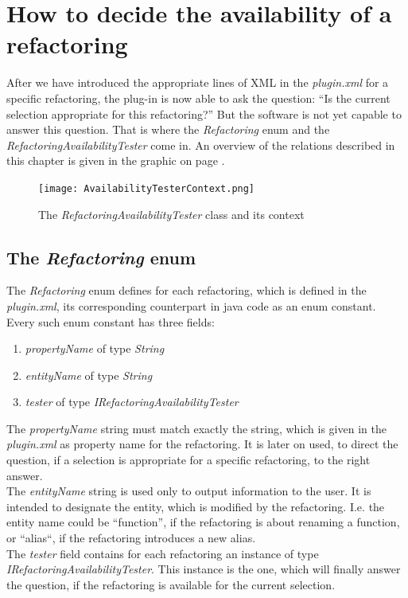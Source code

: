 \documentclass[a4paper,10pt]{report}
\begin{document}
\section{How to decide the availability of a refactoring}
After we have introduced the appropriate lines of XML in the {\it plugin.xml} for a specific refactoring, the plug-in is now able to ask the question:
``Is the current selection appropriate for this refactoring?''
But the software is not yet capable to answer this question.
That is where the {\it Refactoring} enum and the {\it RefactoringAvailabilityTester} come in. 
An overview of the relations described in this chapter is given in the graphic on page \pageref{AvailabilityTesterContext}.

\begin{figure}[h]
\centering
\texttt{[image: AvailabilityTesterContext.png]}
\caption{The {\it RefactoringAvailabilityTester} class and its context}
\label{AvailabilityTesterContext}
\end{figure}

\subsection{The {\it Refactoring} enum}
The {\it Refactoring} enum defines for each refactoring, which is defined in the {\it plugin.xml}, its corresponding counterpart in java code as an enum constant.
Every such enum constant has three fields:
   \begin{enumerate}
     \item {\it propertyName} of type {\it String}
     \item {\it entityName} of type {\it String}
     \item {\it tester}  of type {\it IRefactoringAvailabilityTester}
   \end{enumerate}
The {\it propertyName} string must match exactly the string, which is given in the {\it plugin.xml} as property name for the refactoring. 
It is later on used, to direct the question, if a selection is appropriate for a specific refactoring, to the right answer.\\
The {\it entityName} string is used only to output information to the user.
It is intended to designate the entity, which is modified by the refactoring.
I.e. the entity name could be ``function'', if the refactoring is about renaming a function, or ``alias``, if the refactoring introduces a new alias.\\
The {\it tester} field contains for each refactoring an instance of type {\it IRefactoringAvailabilityTester}.
This instance is the one, which will finally answer the question, if the refactoring is available for the current selection.
\end{document}
